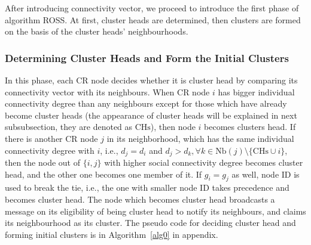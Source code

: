 \documentclass[10pt,journal,compsoc]{IEEEtran}
\theoremstyle{mytheoremstyle}
\theoremstyle{mytheoremstyle}
\theoremstyle{mytheoremstyle}
\newcommand{\ie}{i.e., }
\begin{document}
After introducing connectivity vector, we proceed to introduce the first phase of algorithm ROSS.
At first, cluster heads are determined, then clusters are formed on the basis of the cluster heads' neighbourhoods.


\subsubsection{Determining Cluster Heads and Form the Initial Clusters}
In this phase, each CR node decides whether it is cluster head by comparing its connectivity vector with its neighbours.
When CR node $i$ has bigger individual connectivity degree than any neighbours except for those which have already become cluster heads (the appearance of cluster heads will be explained in next subsubsection, they are denoted as $\text{CHs}$), then node $i$ becomes clusters head.
If there is another CR node $j$ in its neighborhood, which has the same individual connectivity degree with $i$, \ie $d_j = d_i$ and $d_j > d_{k}, \forall k\in \text{Nb}(j)\setminus \{\text{CHs}\cup i\}$, then the node out of $\{i, j\}$ with higher social connectivity degree becomes cluster head, and the other one becomes one member of it. 
If $g_i = g_j$ as well, node ID is used to break the tie, \ie the one with smaller node ID takes precedence and becomes cluster head.
%
The node which becomes cluster head broadcasts a message on its eligibility of being cluster head to notify its neighbours, and claims its neighbourhood as its cluster.
The pseudo code for deciding cluster head and forming initial clusters is in Algorithm~\ref{alg0} in appendix.
\end{document}
